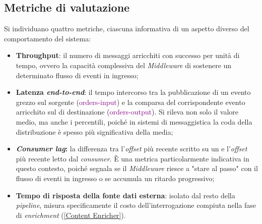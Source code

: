\subsection{Metriche di valutazione}
Si individuano quattro metriche, ciascuna informativa di un aspetto diverso del comportamento del sistema:
\begin{itemize}
    \item \textbf{Throughput}: il numero di messaggi arricchiti con successo per unità di tempo, ovvero la capacità complessiva del \textit{Middleware} di sostenere un determinato flusso di eventi in ingresso;
    \item \textbf{Latenza \textit{end-to-end}}: il tempo intercorso tra la pubblicazione di un evento grezzo sul \textit{} sorgente (\textcolor{purple}{orders-input}) e la comparsa del corrispondente evento arricchito sul \textit{} di destinazione (\textcolor{purple}{orders-output}). Si rileva non solo il valore medio, ma anche i percentili, poiché in sistemi di messaggistica la coda della distribuzione è spesso più significativa della media;
    \item \textbf{\textit{Consumer lag}:} la differenza tra l'\textit{offset} più recente scritto su un \textit{} e l'\textit{offset} più recente letto dal \textit{consumer}. È una metrica particolarmente indicativa in questo contesto, poiché segnala se il \textit{Middleware} riesce a "stare al passo" con il flusso di eventi in ingresso o se accumula un ritardo progressivo;
    \item \textbf{Tempo di risposta della fonte dati esterna}: isolato dal resto della \textit{pipeline}, misura specificamente il costo dell'interrogazione compiuta nella fase di \textit{enrichment} (\ref{Content Enricher}).
\end{itemize}

\newpage
